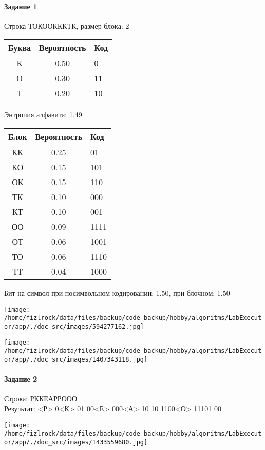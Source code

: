 \documentclass[a4paper, 12pt]{article}
\begin{document}
\paragraph{Задание 1}

Строка ТОКООКККТК, размер блока: 2
\begin{center}
 \begin{tabular}{ |c|c|l| } 
  \hline
     Буква & Вероятность & Код\\ \hline
К & 0.50 & 0\\\hline
О & 0.30 & 11\\\hline
Т & 0.20 & 10
\\ \hline \end{tabular}
\end{center}
Энтропия алфавита: 1.49
\begin{center}
 \begin{tabular}{ |c|c|l| } 
  \hline
     Блок & Вероятность & Код\\ \hline
КК & 0.25 & 01\\\hline
КО & 0.15 & 101\\\hline
ОК & 0.15 & 110\\\hline
ТК & 0.10 & 000\\\hline
КТ & 0.10 & 001\\\hline
ОО & 0.09 & 1111\\\hline
ОТ & 0.06 & 1001\\\hline
ТО & 0.06 & 1110\\\hline
ТТ & 0.04 & 1000
\\ \hline \end{tabular}
\end{center}
Бит на символ при посимвольном кодировании: 1.50, при блочном: 1.50

\texttt{[image: /home/fizlrock/data/files/backup/code\_backup/hobby/algoritms/LabExecutor/app/./doc\_src/images/594277162.jpg]}

\texttt{[image: /home/fizlrock/data/files/backup/code\_backup/hobby/algoritms/LabExecutor/app/./doc\_src/images/1407343118.jpg]}
\pagebreak
\paragraph{Задание 2}

Строка: 
РККЕАРРООО\\
Результат: <Р> 0<К> 01 00<Е> 000<А> 10 10 1100<О> 11101 00

\texttt{[image: /home/fizlrock/data/files/backup/code\_backup/hobby/algoritms/LabExecutor/app/./doc\_src/images/1433559680.jpg]}
\end{document}
